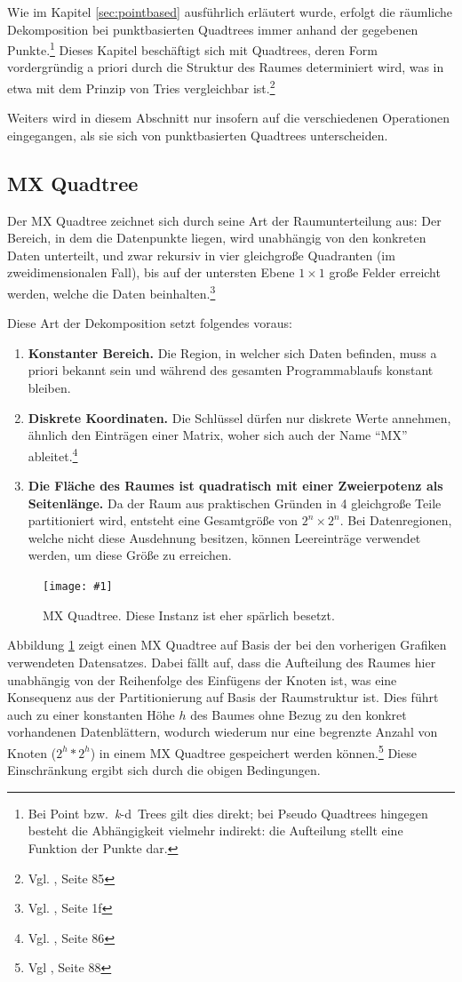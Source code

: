 \documentclass[%
			paper=a4,%
			DIV12,
			liststotoc,
			bibtotoc,
			draft=false,%
			titlepage,
			numbers=noendperiod
			]{scrartcl}
\newcommand{\zit}[3]{#1 \cite{#2}, #3}
\newcommand{\footzit}[3]{\footnote{\zit{#1}{#2}{#3}}}
\newcommand{\kd}{\mbox{\textit{k}-d}}
\newcommand{\myfig}[5] {
 \begin{figure}[tbph]
	 \centering
	 \texttt{[image: \#1]}
	 \caption[#4]{#5}
	 \label{fig:#2}
 \end{figure}
}
\begin{document}
Wie im Kapitel \ref{sec:pointbased} ausführlich erläutert wurde, erfolgt die räumliche Dekomposition bei punkt\-basierten Quadtrees immer anhand der gegebenen Punkte.\footnote{Bei Point bzw.\ \kd\ Trees gilt dies direkt; bei Pseudo Quadtrees hingegen besteht die Abhängigkeit vielmehr indirekt: die Aufteilung stellt eine Funktion der Punkte dar.}
Dieses Kapitel beschäftigt sich mit Quadtrees, deren Form vordergründig a priori durch die Struktur des Raumes determiniert wird, was in etwa mit dem Prinzip von Tries vergleichbar ist.\footzit{Vgl.}{Samet90}{Seite 85}

Weiters wird in diesem Abschnitt nur insofern auf die verschiedenen Operationen eingegangen, als sie sich von punktbasierten Quadtrees unterscheiden.

\subsection{MX Quadtree}
Der MX Quadtree zeichnet sich durch seine Art der Raumunterteilung aus:
Der Bereich, in dem die Datenpunkte liegen, wird unabhängig von den konkreten Daten unterteilt,
und zwar rekursiv in vier gleichgroße Quadranten (im zweidimensionalen Fall), 
bis auf der untersten Ebene $1\times1$ große Felder erreicht werden, welche die Daten beinhalten.\footzit{Vgl.}{Samet:1985:SCP:282957.282966}{Seite 1f}

Diese Art der Dekomposition setzt folgendes voraus:
\renewcommand{\labelenumi}{({\theenumi})}
\begin{enumerate}
	\item \textbf{Konstanter Bereich.}
		Die Region, in welcher sich Daten befinden, muss a priori bekannt sein und während des gesamten Programmablaufs konstant bleiben.
	\item \textbf{Diskrete Koordinaten.}
		Die Schlüssel dürfen nur diskrete Werte annehmen, ähnlich den Einträgen einer Matrix, woher sich auch der Name "`MX"' ableitet.\footzit{Vgl.}{Samet90}{Seite 86}
	\item \textbf{Die Fläche des Raumes ist quadratisch mit einer Zweierpotenz als Seitenlänge.}
		Da der Raum aus praktischen Gründen in 4 gleichgroße Teile partitioniert wird, entsteht eine Gesamtgröße von $2^n\times2^n$. Bei Datenregionen, welche nicht diese Ausdehnung besitzen, können Leereinträge verwendet werden, um diese Größe zu erreichen.
\end{enumerate}

\myfig{img/mxquadtre-full-origdata-trimmed}{mxquadtree}{width=.7\textwidth}{MX Quadtree}{MX Quadtree. Diese Instanz ist eher spärlich besetzt.}
Abbildung \ref{fig:mxquadtree} zeigt einen MX Quadtree auf Basis der bei den vorherigen Grafiken verwendeten Datensatzes.
Dabei fällt auf, dass die Aufteilung des Raumes hier unabhängig von der Reihenfolge des Einfügens der Knoten ist,
was eine Konsequenz aus der Partitionierung auf Basis der Raumstruktur ist.
Dies führt auch zu einer konstanten Höhe $h$ des Baumes ohne Bezug zu den konkret vorhandenen Datenblättern, wodurch wiederum nur eine begrenzte Anzahl von Knoten ($2^h * 2^h$) in einem MX Quadtree gespeichert werden können.\footzit{Vgl}{Samet90}{Seite 88}
Diese Einschränkung ergibt sich durch die obigen Bedingungen.
\end{document}
